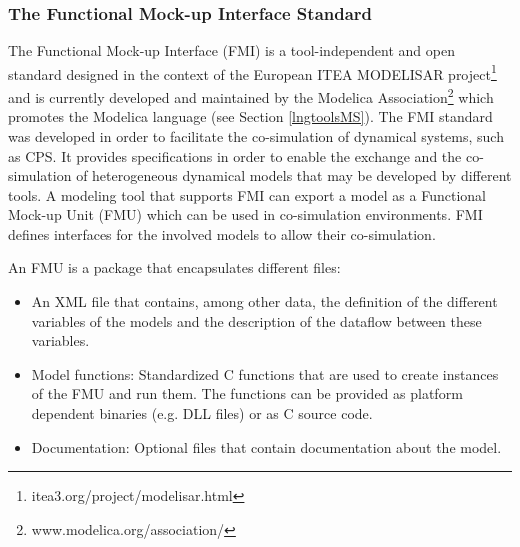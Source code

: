 \subsubsection{The Functional Mock-up Interface Standard}

The Functional Mock-up Interface (FMI) is a tool-independent and open standard designed in the context of the European ITEA MODELISAR project\footnote{itea3.org/project/modelisar.html} and is currently developed and maintained by the Modelica Association\footnote{www.modelica.org/association/} which promotes the Modelica language (see Section \ref{lngtoolsMS}). The FMI standard was developed in order to facilitate the co-simulation of dynamical systems, such as CPS. It provides specifications in order to enable the exchange and the co-simulation of heterogeneous dynamical models that may be developed by different tools. A modeling tool that supports FMI can export a model as a Functional Mock-up Unit (FMU) which can be used in co-simulation environments. FMI defines interfaces for the involved models to allow their co-simulation.



An FMU is a package that encapsulates different files:

\begin{itemize}
\item An XML file that contains, among other data, the definition of the different variables of the models and the description of the dataflow between these variables. 
\item Model functions: Standardized C functions that are used to create instances of the FMU and run them. The functions can be provided as platform dependent binaries (e.g. DLL files) or as C source code.
\item Documentation: Optional files that contain documentation about the model.
\end{itemize}

